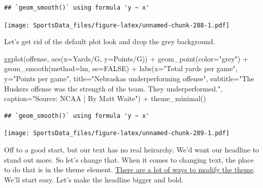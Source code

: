 \documentclass[
]{book}
\newenvironment{Shaded}{\begin{snugshade}}{\end{snugshade}}
\newcommand{\AttributeTok}[1]{\textcolor[rgb]{0.77,0.63,0.00}{#1}}
\newcommand{\ConstantTok}[1]{\textcolor[rgb]{0.00,0.00,0.00}{#1}}
\newcommand{\FunctionTok}[1]{\textcolor[rgb]{0.00,0.00,0.00}{#1}}
\newcommand{\NormalTok}[1]{#1}
\newcommand{\SpecialCharTok}[1]{\textcolor[rgb]{0.00,0.00,0.00}{#1}}
\newcommand{\StringTok}[1]{\textcolor[rgb]{0.31,0.60,0.02}{#1}}
\begin{document}
\begin{verbatim}
## `geom_smooth()` using formula 'y ~ x'
\end{verbatim}

\texttt{[image: SportsData\_files/figure-latex/unnamed-chunk-288-1.pdf]}

Let's get rid of the default plot look and drop the grey background.

\begin{Shaded}
\begin{Highlighting}[]
\FunctionTok{ggplot}\NormalTok{(offense, }\FunctionTok{aes}\NormalTok{(}\AttributeTok{x=}\StringTok{\textasciigrave{}}\AttributeTok{Yards/G}\StringTok{\textasciigrave{}}\NormalTok{, }\AttributeTok{y=}\StringTok{\textasciigrave{}}\AttributeTok{Points/G}\StringTok{\textasciigrave{}}\NormalTok{)) }\SpecialCharTok{+} 
  \FunctionTok{geom\_point}\NormalTok{(}\AttributeTok{color=}\StringTok{"grey"}\NormalTok{) }\SpecialCharTok{+} \FunctionTok{geom\_smooth}\NormalTok{(}\AttributeTok{method=}\NormalTok{lm, }\AttributeTok{se=}\ConstantTok{FALSE}\NormalTok{) }\SpecialCharTok{+} 
  \FunctionTok{labs}\NormalTok{(}\AttributeTok{x=}\StringTok{"Total yards per game"}\NormalTok{, }\AttributeTok{y=}\StringTok{"Points per game"}\NormalTok{, }\AttributeTok{title=}\StringTok{"Nebraska\textquotesingle{}s underperforming offense"}\NormalTok{, }\AttributeTok{subtitle=}\StringTok{"The Husker\textquotesingle{}s offense was the strength of the team. They underperformed."}\NormalTok{, }\AttributeTok{caption=}\StringTok{"Source: NCAA | By Matt Waite"}\NormalTok{) }\SpecialCharTok{+} 
  \FunctionTok{theme\_minimal}\NormalTok{()}
\end{Highlighting}
\end{Shaded}

\begin{verbatim}
## `geom_smooth()` using formula 'y ~ x'
\end{verbatim}

\texttt{[image: SportsData\_files/figure-latex/unnamed-chunk-289-1.pdf]}

Off to a good start, but our text has no real heirarchy. We'd want our headline to stand out more. So let's change that. When it comes to changing text, the place to do that is in the theme element. \href{http://ggplot2.tidyverse.org/reference/theme.html}{There are a lot of ways to modify the theme}. We'll start easy. Let's make the headline bigger and bold.
\end{document}
